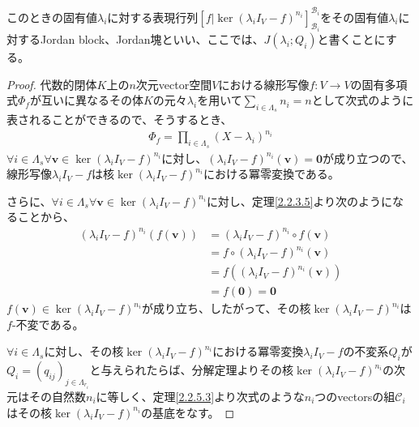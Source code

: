 \documentclass[dvipdfmx]{jsarticle}
\begin{document}
\begin{dfn}\label{Jordan block}
このときの固有値$\lambda_{i}$に対する表現行列$\left[ f|\ker\left( \lambda_{i}I_{V} - f \right)^{n_{i}} \right]_{\mathcal{B}_{i}}^{\mathcal{B}_{i}}$をその固有値$\lambda_{i}$に対するJordan block、Jordan塊といい、ここでは、$J\left( \lambda_{i};Q_{i} \right)$と書くことにする。
\end{dfn}
\begin{proof}
代数的閉体$K$上の$n$次元vector空間$V$における線形写像$f:V \rightarrow V$の固有多項式$\varPhi_{f}$が互いに異なるその体$K$の元々$\lambda_{i}$を用いて$\sum_{i \in \varLambda_{s}} n_{i} = n$として次式のように表されることができるので、そうするとき、
\begin{align*}
\varPhi_{f} = \prod_{i \in \varLambda_{s}} \left( X - \lambda_{i} \right)^{n_{i}}
\end{align*}
$\forall i \in \varLambda_{s}\forall\mathbf{v} \in \ker\left( \lambda_{i}I_{V} - f \right)^{n_{i}}$に対し、$\left( \lambda_{i}I_{V} - f \right)^{n_{i}}\left( \mathbf{v} \right) = \mathbf{0}$が成り立つので、線形写像$\lambda_{i}I_{V} - f$は核$\ker\left( \lambda_{i}I_{V} - f \right)^{n_{i}}$における冪零変換である。\par
さらに、$\forall i \in \varLambda_{s}\forall\mathbf{v} \in \ker\left( \lambda_{i}I_{V} - f \right)^{n_{i}}$に対し、定理\ref{2.2.3.5}より次のようになることから、
\begin{align*}
\left( \lambda_{i}I_{V} - f \right)^{n_{i}}\left( f\left( \mathbf{v} \right) \right) &= \left( \lambda_{i}I_{V} - f \right)^{n_{i}} \circ f\left( \mathbf{v} \right)\\
&= f \circ \left( \lambda_{i}I_{V} - f \right)^{n_{i}}\left( \mathbf{v} \right)\\
&= f\left( \left( \lambda_{i}I_{V} - f \right)^{n_{i}}\left( \mathbf{v} \right) \right)\\
&= f\left( \mathbf{0} \right) = \mathbf{0}
\end{align*}
$f\left( \mathbf{v} \right) \in \ker\left( \lambda_{i}I_{V} - f \right)^{n_{i}}$が成り立ち、したがって、その核$\ker\left( \lambda_{i}I_{V} - f \right)^{n_{i}}$は$f$-不変である。\par
$\forall i \in \varLambda_{s}$に対し、その核$\ker\left( \lambda_{i}I_{V} - f \right)^{n_{i}}$における冪零変換$\lambda_{i}I_{V} - f$の不変系$Q_{i}$が$Q_{i} = \left( q_{ij} \right)_{j \in \varLambda_{r_{i}}}$と与えられたらば、分解定理よりその核$\ker\left( \lambda_{i}I_{V} - f \right)^{n_{i}}$の次元はその自然数$n_{i}$に等しく、定理\ref{2.2.5.3}より次式のような$n_{i}$つのvectorsの組$\mathcal{C}_{i}$はその核$\ker\left( \lambda_{i}I_{V} - f \right)^{n_{i}}$の基底をなす。

\end{proof}
\end{document}
